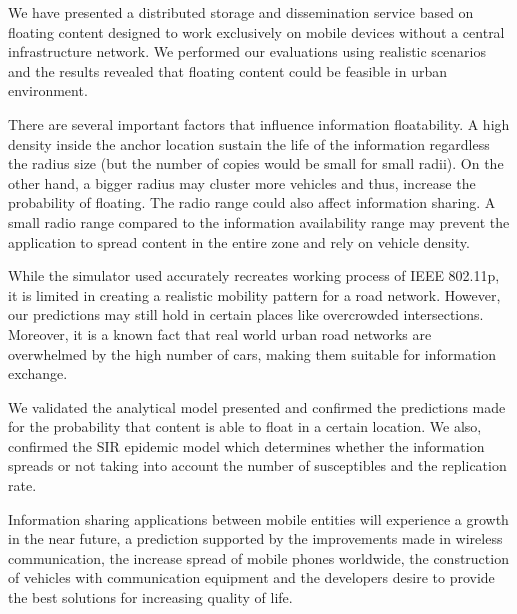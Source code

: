 We have presented a distributed storage and dissemination service based on
floating content designed to work exclusively on mobile devices without a
central infrastructure network. We performed our evaluations using realistic
scenarios and the results revealed that floating content could be feasible in
urban environment.

There are several important factors that influence information floatability.
A high density inside the anchor location sustain the life of the information
regardless the radius size (but the number of copies would be small for small
radii). On the other hand, a bigger radius may cluster more vehicles and thus,
increase the probability of floating. The radio range could also affect
information sharing. A small radio range compared to the information
availability range may prevent the application to spread content in the entire
zone and rely on vehicle density.

While the simulator used accurately recreates working process of IEEE 802.11p,
it is limited in creating a realistic mobility pattern for a road network.
However, our predictions may still hold in certain places like overcrowded
intersections. Moreover, it is a known fact that real world urban road networks
are overwhelmed by the high number of cars, making them suitable for information
exchange.

We validated the analytical model presented and confirmed the predictions made
for the probability that content is able to float in a certain location. We
also, confirmed the SIR epidemic model which determines whether the information
spreads or not taking into account the number of susceptibles and the
replication rate.

Information sharing applications between mobile entities will experience a
growth in the near future, a prediction supported by the improvements made in
wireless communication, the increase spread of mobile phones worldwide, the
construction of vehicles with communication equipment and the developers desire
to provide the best solutions for increasing quality of life. 
